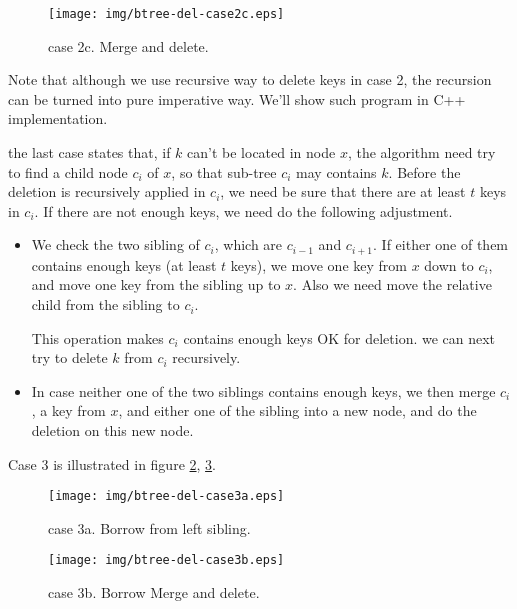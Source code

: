 \documentclass{article}
\begin{document}
\begin{figure}[htbp]
  \begin{center}
    \texttt{[image: img/btree-del-case2c.eps]}
    \caption{case 2c. Merge and delete.} \label{fig:btree-del-case2c}
  \end{center}
\end{figure}

Note that although we use recursive way to delete keys in case 2, the 
recursion can be turned into pure imperative way. We'll show such
program in C++ implementation.

the last case states that, if $k$ can't be located in node $x$, the algorithm
need try to find a child node $c_i$ of $x$, so that sub-tree $c_i$ may 
contains $k$. Before the deletion is recursively applied in $c_i$, we
need be sure that there are at least $t$ keys in $c_i$. If there are
not enough keys, we need do the following adjustment.

\begin{itemize}
\item We check the two sibling of $c_i$, which are $c_{i-1}$ and $c_{i+1}$.
If either one of them contains enough keys (at least $t$ keys), we move
one key from $x$ down to $c_i$, and move one key from the sibling up to
$x$. Also we need move the relative child from the sibling to $c_i$.

This operation makes $c_i$ contains enough keys OK for deletion. we can
next try to delete $k$ from $c_i$ recursively.

\item In case neither one of the two siblings contains enough keys, we then 
merge $c_i$, a key from $x$, and either one of the sibling into a new
node, and do the deletion on this new node.
\end{itemize}

Case 3 is illustrated in figure \ref{fig:btree-del-case3a}, \ref{fig:btree-del-case3b}.

\begin{figure}[htbp]
  \begin{center}
    \texttt{[image: img/btree-del-case3a.eps]}
    \caption{case 3a. Borrow from left sibling.} \label{fig:btree-del-case3a}
  \end{center}
\end{figure}

\begin{figure}[htbp]
  \begin{center}
    \texttt{[image: img/btree-del-case3b.eps]}
    \caption{case 3b. Borrow Merge and delete.} \label{fig:btree-del-case3b}
  \end{center}
\end{figure}
\end{document}
